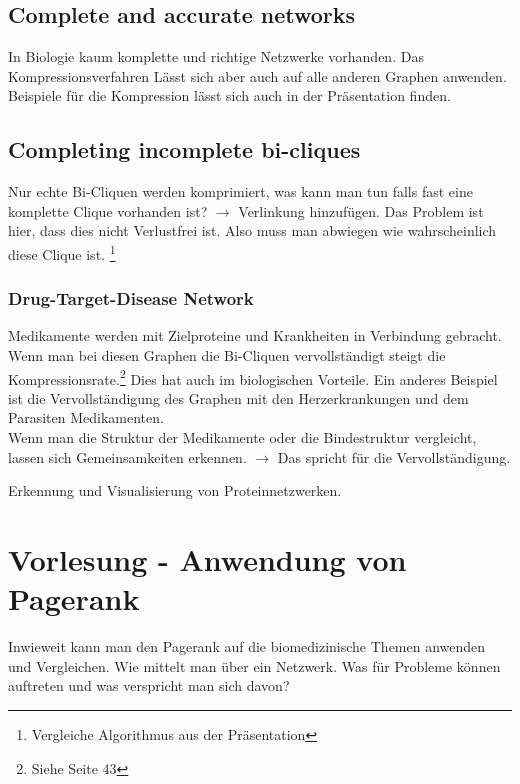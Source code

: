 \documentclass{article}
\begin{document}
\subsection{Complete and accurate networks}
In Biologie kaum komplette und richtige Netzwerke vorhanden. Das Kompressionsverfahren
Lässt sich aber auch auf alle anderen Graphen anwenden. Beispiele für die Kompression
lässt sich auch in der Präsentation finden.
\subsection{Completing incomplete bi-cliques}
Nur echte Bi-Cliquen werden komprimiert, was kann man tun falls fast eine komplette
Clique vorhanden ist? $\rightarrow$ Verlinkung hinzufügen. Das Problem ist hier,
dass dies nicht Verlustfrei ist. Also muss man abwiegen wie wahrscheinlich diese
Clique ist. \footnote{Vergleiche Algorithmus aus der Präsentation}
\subsubsection{Drug-Target-Disease Network}
Medikamente werden mit Zielproteine und Krankheiten in Verbindung gebracht.
Wenn man bei diesen Graphen die Bi-Cliquen vervollständigt steigt die 
Kompressionsrate.\footnote{Siehe Seite 43} Dies hat auch im biologischen
Vorteile. Ein anderes Beispiel ist die Vervollständigung des Graphen mit den
Herzerkrankungen und dem Parasiten Medikamenten.\\
Wenn man die Struktur der Medikamente oder die Bindestruktur vergleicht, lassen
sich Gemeinsamkeiten erkennen. $\rightarrow$ Das spricht für die Vervollständigung.

\newpage

Erkennung und Visualisierung von Proteinnetzwerken. 

\section{Vorlesung - Anwendung von Pagerank}
Inwieweit kann man den Pagerank auf die biomedizinische Themen anwenden und Vergleichen.
Wie mittelt man über ein Netzwerk. Was für Probleme können auftreten und was verspricht man sich davon?
\end{document}
